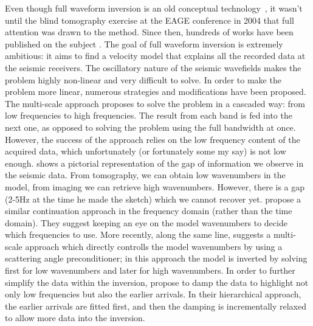 Even though full waveform inversion is an old conceptual technology~\citep{tarantola,lailly1983seismic,
Pratt99,Sirgue,VirieuxFWI}, 
it wasn't until the blind tomography exercise at the EAGE conference in 2004 \citep{billette20052004}
that full attention was drawn to the method. Since then, hundreds of works have been 
published on the subject \citep{guittonTLE}. The goal of full waveform inversion 
is extremely ambitious: it aims to find a velocity model that explains all the recorded data
at the seismic receivers. The oscillatory nature of the seismic wavefields makes the problem
highly non-linear and very difficult to solve. In order to make the problem more
linear, numerous strategies and modifications have been proposed. The multi-scale approach \citep{Bunks95}
proposes to solve the problem in a cascaded way: from low frequencies to high frequencies. The
result from each band is fed into the next one, as opposed to solving the problem using the 
full bandwidth at once. However, the success of the approach relies on the 
low frequency content of the acquired data, which unfortunately (or fortunately some my say) is not 
low enough. 
  \citep{Claerbout:1985:IEI:3887} shows a pictorial representation of the gap of 
information we observe in the seismic data.  From tomography, we can obtain
low wavenumbers in the model, from imaging we can retrieve high wavenumbers. However, there is a 
gap (2-5Hz at the time he made the sketch) which we cannot recover yet. 
 \cite{Sirgue} propose a similar continuation approach in the frequency domain (rather than the time domain). 
They suggest keeping an eye on the model wavenumbers to decide which frequencies to use. More
recently, along the same line, \cite{TariqWavenumber} suggests a multi-scale approach which directly controlls
the model wavenumbers by using a scattering angle preconditioner; in this approach the model is inverted
by solving first for low wavenumbers and later for high wavenumbers. In order to further simplify the 
data within the inversion, \citep{ShinHa.geo.2008,shin_cha} propose to  damp the data
to highlight not only low frequencies but also the earlier arrivals. In their hierarchical 
approach, the earlier arrivals are fitted first, and then the damping is incrementally  relaxed to allow more
data into the inversion. 

